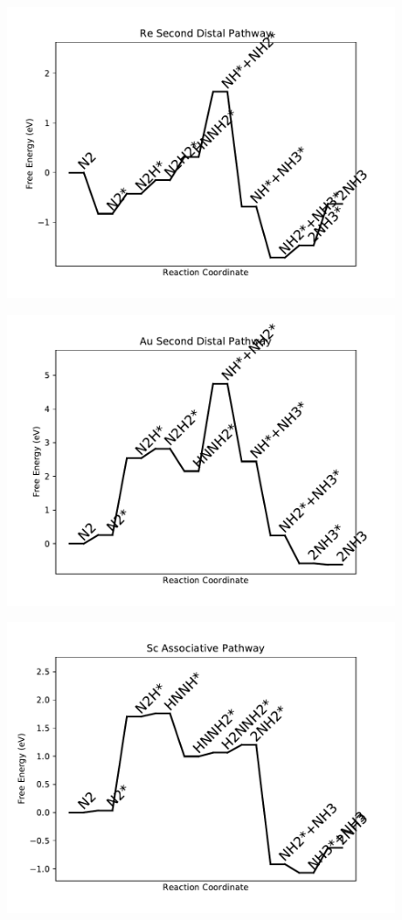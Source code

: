 \begin{figure}
\includegraphics[width=0.8\linewidth]{data/plots/Re_distal_2.pdf}
\label{fig:Re_distal_2}
\end{figure}

\begin{figure}
\includegraphics[width=0.8\linewidth]{data/plots/Au_distal_2.pdf}
\label{fig:Au_distal_2}
\end{figure}

\begin{figure}
\includegraphics[width=0.8\linewidth]{data/plots/Sc_associative.pdf}
\label{fig:Sc_associative}
\end{figure}

